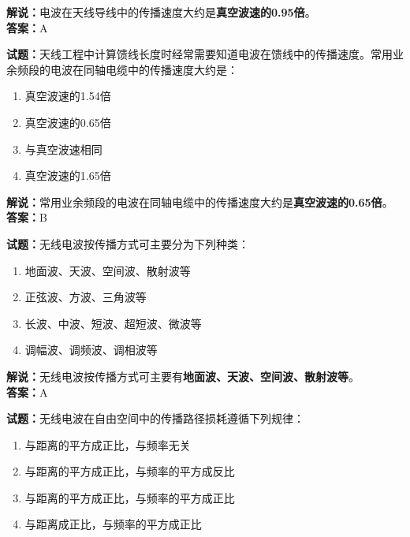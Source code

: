 \documentclass{ctexbook}
\begin{document}
\noindent\textbf{解说：}电波在天线导线中的传播速度大约是\textbf{真空波速的\num{0.95}倍}。\\\noindent\textbf{答案：}A

\vspace{\baselineskip}

\noindent\textbf{试题：}天线工程中计算馈线长度时经常需要知道电波在馈线中的传播速度。常用业余频段的电波在同轴电缆中的传播速度大约是：

\begin{enumerate}[leftmargin=3em]
  \item 真空波速的\num{1.54}倍
  \item 真空波速的\num{0.65}倍
  \item 与真空波速相同
  \item 真空波速的\num{1.65}倍
\end{enumerate}

\noindent\textbf{解说：}常用业余频段的电波在同轴电缆中的传播速度大约是\textbf{真空波速的\num{0.65}倍}。\\\noindent\textbf{答案：}B

\vspace{\baselineskip}

\noindent\textbf{试题：}无线电波按传播方式可主要分为下列种类：

\begin{enumerate}[leftmargin=3em]
  \item 地面波、天波、空间波、散射波等
  \item 正弦波、方波、三角波等
  \item 长波、中波、短波、超短波、微波等
  \item 调幅波、调频波、调相波等
\end{enumerate}

\noindent\textbf{解说：}无线电波按传播方式可主要有\textbf{地面波、天波、空间波、散射波等}。\\\noindent\textbf{答案：}A

\vspace{\baselineskip}

\noindent\textbf{试题：}无线电波在自由空间中的传播路径损耗遵循下列规律：

\begin{enumerate}[leftmargin=3em]
  \item 与距离的平方成正比，与频率无关
  \item 与距离的平方成正比，与频率的平方成反比
  \item 与距离的平方成正比，与频率的平方成正比
  \item 与距离成正比，与频率的平方成正比
\end{enumerate}
\end{document}
